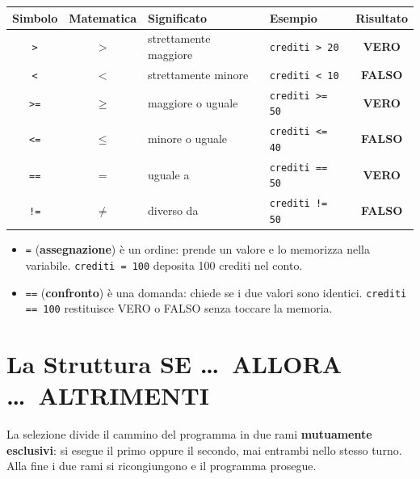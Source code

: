 \begin{center}
\renewcommand{\arraystretch}{1.35}
\begin{tabular}{|c|c|l|l|c|}
\hline
\rowcolor{PiazzaPrimary!15}
\textbf{Simbolo} & \textbf{Matematica} & \textbf{Significato} & \textbf{Esempio} & \textbf{Risultato} \\
\hline
\texttt{>}  & $>$    & strettamente maggiore & \texttt{crediti > 20}  & \textbf{VERO} \\
\texttt{<}  & $<$    & strettamente minore   & \texttt{crediti < 10}  & \textbf{FALSO} \\
\texttt{>=} & $\geq$ & maggiore o uguale     & \texttt{crediti >= 50} & \textbf{VERO} \\
\texttt{<=} & $\leq$ & minore o uguale       & \texttt{crediti <= 40} & \textbf{FALSO} \\
\texttt{==} & $=$    & uguale a              & \texttt{crediti == 50} & \textbf{VERO} \\
\texttt{!=} & $\neq$ & diverso da            & \texttt{crediti != 50} & \textbf{FALSO} \\
\hline
\end{tabular}
\end{center}

\begin{attenzione}[La Trappola Numero 1: \texttt{=} contro \texttt{==}]
\begin{itemize}
  \item \texttt{=} (\textbf{assegnazione}) è un ordine: prende un valore e lo memorizza nella variabile. \texttt{crediti = 100} deposita 100 crediti nel conto.
  \item \texttt{==} (\textbf{confronto}) è una domanda: chiede se i due valori sono identici. \texttt{crediti == 100} restituisce VERO o FALSO senza toccare la memoria.
\end{itemize}
\end{attenzione}

\section{La Struttura SE \dots\ ALLORA \dots\ ALTRIMENTI}

La selezione divide il cammino del programma in due rami \textbf{mutuamente esclusivi}: si esegue il primo oppure il secondo, mai entrambi nello stesso turno. Alla fine i due rami si ricongiungono e il programma prosegue.

